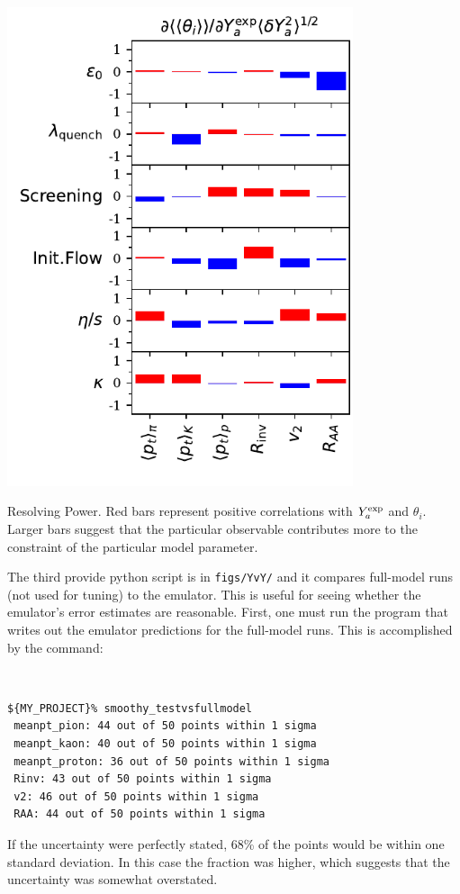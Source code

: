 \documentclass[UserManual.tex]{subfiles}
\begin{document}
\parbox{4.0in}{\centerline{\includegraphics[width=4.0in]{RP_rhic.pdf}}}
\parbox{2.5in}{Resolving Power. Red bars represent positive correlations with $Y^{\rm exp}_a$ and $\theta_i$. Larger bars suggest that the particular observable contributes more to the constraint of the particular model parameter.}

The third provide python script is in {\tt figs/YvY/} and it compares full-model runs (not used for tuning) to the emulator. This is useful for seeing whether the emulator's error estimates are reasonable. First, one must run the program that writes out the emulator predictions for the full-model runs. This is accomplished by the command:
{\tt
\begin{verbatim}
${MY_PROJECT}% smoothy_testvsfullmodel
 meanpt_pion: 44 out of 50 points within 1 sigma
 meanpt_kaon: 40 out of 50 points within 1 sigma
 meanpt_proton: 36 out of 50 points within 1 sigma
 Rinv: 43 out of 50 points within 1 sigma
 v2: 46 out of 50 points within 1 sigma
 RAA: 44 out of 50 points within 1 sigma
\end{verbatim}}
If the uncertainty were perfectly stated, 68\% of the points would be within one standard deviation. In this case the fraction was higher, which suggests that the uncertainty was somewhat overstated.
\end{document}
